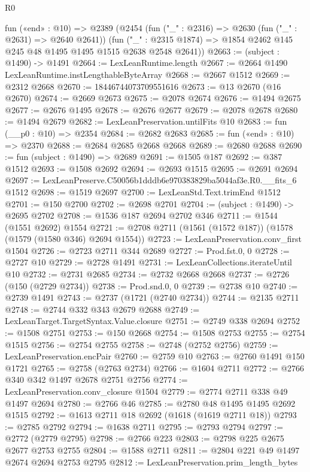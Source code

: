 \begin{lexlean}{R0}
\begin{coremodule}
  fun («end» : @10) =>
  @2389
    (@2454
      (fun ("_" : @2316) => @2630 (fun ("_" : @2631) => @2640 @2641))
      (fun ("_" : @2315 @1874) => @1854 @2462 @145 @245 @48 @1495 @1495 @1515 @2638 @2548 @2641))
@2663 := (subject : @1490) -> @1491
@2664 := LexLeanRuntime.length
@2667 := @2664 @1490 LexLeanRuntime.instLengthableByteArray
@2668 := @2667 @1512
@2669 := @2312 @2668
@2670 := 18446744073709551616
@2673 := @13 @2670 (@16 @2670)
@2674 := @2669 @2673
@2675 := @2078 @2674
@2676 := @1494 @2675
@2677 := @2676 @1495
@2678 := @2676 @2677
@2679 := @2078 @2678
@2680 := @1494 @2679
@2682 := LexLeanPreservation.untilFits @10
@2683 := fun (__p0 : @10) => @2354
@2684 := @2682 @2683
@2685 := fun («end» : @10) => @2370
@2688 := @2684 @2685 @2668 @2668
@2689 := @2680 @2688
@2690 := fun (subject : @1490) => @2689
@2691 := @1505 @187
@2692 := @387 @1512
@2693 := @1508 @2692
@2694 := @2693 @1515
@2695 := @2691 @2694
@2697 := LexLeanPreserve.C50056b1dddb6e970383829ba5044af3e.R0.__fits_6 @1512
@2698 := @1519 @2697
@2700 := LexLeanStd.Text.trimEnd @1512
@2701 := @150 @2700
@2702 := @2698 @2701
@2704 := (subject : @1490) -> @2695 @2702
@2708 := @1536 @187 @2694 @2702 @346
@2711 := @1544 (@1551 @2692) @1554
@2721 := @2708 @2711 (@1561 (@1572 @187)) (@1578 (@1579 (@1580 @346) @2694 @1554))
@2723 := LexLeanPreservation.conv_first @1504
@2726 := @2723 @2711 @344 @2689
@2727 := Prod.fst.{0, 0}
@2728 := @2727 @10
@2729 := @2728 @1491
@2731 := LexLeanCollections.iterateUntil @10
@2732 := @2731 @2685
@2734 := @2732 @2668 @2668
@2737 := @2726 (@150 (@2729 @2734))
@2738 := Prod.snd.{0, 0}
@2739 := @2738 @10
@2740 := @2739 @1491
@2743 := @2737 (@1721 (@2740 @2734))
@2744 := @2135 @2711
@2748 := @2744 @332 @343 @2679 @2688
@2749 := LexLeanTarget.TargetSyntax.Value.closure
@2751 := @2749 @338 @2694
@2752 := @1508 @2751
@2753 := @150 @2668
@2754 := @1508 @2753
@2755 := @2754 @1515
@2756 := @2754 @2755
@2758 := @2748 (@2752 @2756)
@2759 := LexLeanPreservation.encPair
@2760 := @2759 @10
@2763 := @2760 @1491 @150 @1721
@2765 := @2758 (@2763 @2734)
@2766 := @1604 @2711
@2772 := @2766 @340 @342 @1497 @2678 @2751 @2756
@2774 := LexLeanPreservation.conv_closure @1504
@2779 := @2774 @2711 @338 @49 @1497 @2694
@2780 := @2766 @46
@2785 := @2780 @48 @1495 @1495 @2692 @1515
@2792 := @1613 @2711 @18 @2692 (@1618 (@1619 @2711 @18))
@2793 := @2785 @2792
@2794 := @1638 @2711
@2795 := @2793 @2794
@2797 := @2772 (@2779 @2795)
@2798 := @2766 @223
@2803 := @2798 @225 @2675 @2677 @2753 @2755
@2804 := @1588 @2711
@2811 := @2804 @221 @49 @1497 @2674 @2694 @2753 @2795
@2812 := LexLeanPreservation.prim_length_bytes

\end{coremodule}
\end{lexlean}
